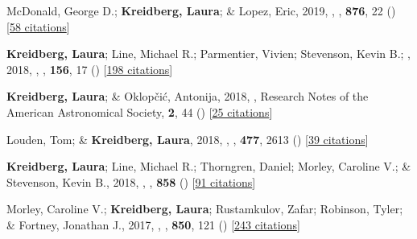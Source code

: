\item[{\color{numcolor}\scriptsize14}] McDonald, George D.; \textbf{Kreidberg, Laura}; \& Lopez, Eric, 2019, , \apj, \textbf{876}, 22 () [\href{https://ui.adsabs.harvard.edu/abs/2019ApJ...876...22M}{58 citations}]

\item[{\color{numcolor}\scriptsize13}] \textbf{Kreidberg, Laura}; Line, Michael R.; Parmentier, Vivien; Stevenson, Kevin B.; \etal, 2018, , \aj, \textbf{156}, 17 () [\href{https://ui.adsabs.harvard.edu/abs/2018AJ....156...17K}{198 citations}]

\item[{\color{numcolor}\scriptsize12}] \textbf{Kreidberg, Laura}; \& Oklop{\v{c}}i{\'c}, Antonija, 2018, , Research Notes of the American Astronomical Society, \textbf{2}, 44 () [\href{https://ui.adsabs.harvard.edu/abs/2018RNAAS...2...44K}{25 citations}]

\item[{\color{numcolor}\scriptsize11}] Louden, Tom; \& \textbf{Kreidberg, Laura}, 2018, , \mnras, \textbf{477}, 2613 () [\href{https://ui.adsabs.harvard.edu/abs/2018MNRAS.477.2613L}{39 citations}]

\item[{\color{numcolor}\scriptsize10}] \textbf{Kreidberg, Laura}; Line, Michael R.; Thorngren, Daniel; Morley, Caroline V.; \& Stevenson, Kevin B., 2018, , \apj, \textbf{858} () [\href{https://ui.adsabs.harvard.edu/abs/2018ApJ...858L...6K}{91 citations}]

\item[{\color{numcolor}\scriptsize9}] Morley, Caroline V.; \textbf{Kreidberg, Laura}; Rustamkulov, Zafar; Robinson, Tyler; \& Fortney, Jonathan J., 2017, , \apj, \textbf{850}, 121 () [\href{https://ui.adsabs.harvard.edu/abs/2017ApJ...850..121M}{243 citations}]

